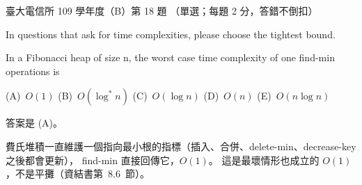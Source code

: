 \begin{pastexam}[label={px:ntu-109-comm-dsa-18}]{臺大電信所 109 學年度（B）第 18 題}
（單選；每題 2 分，答錯不倒扣）

In questions that ask for time complexities, please choose the tightest bound.

In a Fibonacci heap of size n, the worst case time complexity of one find-min operations is

(A)~$O(1)$ \qquad (B)~$O(\log^* n)$ \qquad (C)~$O(\log n)$ \qquad (D)~$O(n)$ \qquad (E)~$O(n\log n)$
\end{pastexam}

\begin{pastsoln}
答案是 (A)。

費氏堆積一直維護一個指向最小根的指標（插入、合併、delete-min、decrease-key 之後都會更新），
find-min 直接回傳它，$O(1)$。 這是最壞情形也成立的 $O(1)$，不是平攤（資結書第~8.6~節）。
\end{pastsoln}
